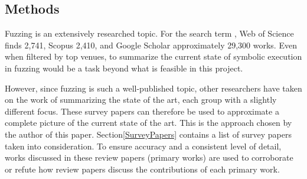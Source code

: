 \documentclass{article}
\begin{document}
\begin{multicols}{2}
    \section{Methods}
    \label{Methods}
    Fuzzing is an extensively researched topic. For the search term , Web of Science\cite{WebOfScience} finds 2,741, Scopus\cite{Scopus} 2,410, and Google Scholar\cite{GoogleScholar} approximately 29,300 works. Even when filtered by top venues, to summarize the current state of symbolic execution in fuzzing would be a task beyond what is feasible in this project.

    However, since fuzzing is such a well-published topic, other researchers have taken on the work of summarizing the state of the art, each group with a slightly different focus. These survey papers can therefore be used to approximate a complete picture of the current state of the art. This is the approach chosen by the author of this paper. Section\ref{SurveyPapers} contains a list of survey papers taken into consideration. To ensure accuracy and a consistent level of detail, works discussed in these review papers (primary works) are used to corroborate or refute how review papers discuss the contributions of each primary work.


\end{multicols}
\end{document}
